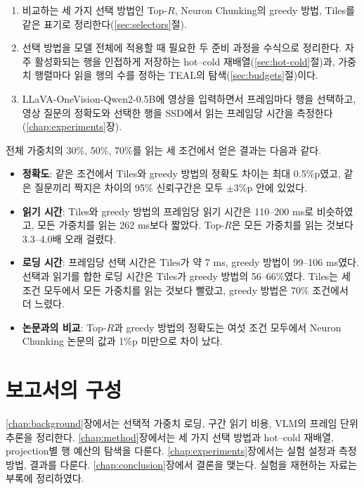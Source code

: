 \begin{enumerate}
\item 비교하는 세 가지 선택 방법인 Top-$R$, Neuron Chunking의 greedy 방법, Tiles를 같은 표기로 정리한다(\ref{sec:selectors}절).
\item 선택 방법을 모델 전체에 적용할 때 필요한 두 준비 과정을 수식으로 정리한다. 자주 활성화되는 행을 인접하게 저장하는 hot--cold 재배열(\ref{sec:hot-cold}절)과, 가중치 행렬마다 읽을 행의 수를 정하는 TEAL의 탐색(\ref{sec:budgets}절)이다.
\item LLaVA-OneVision-Qwen2-0.5B에 영상을 입력하면서 프레임마다 행을 선택하고, 영상 질문의 정확도와 선택한 행을 SSD에서 읽는 프레임당 시간을 측정한다(\ref{chap:experiments}장).
\end{enumerate}

전체 가중치의 30\%, 50\%, 70\%를 읽는 세 조건에서 얻은 결과는 다음과 같다.

\begin{itemize}
\item \textbf{정확도}: 같은 조건에서 Tiles와 greedy 방법의 정확도 차이는 최대 0.5\%p였고, 같은 질문끼리 짝지은 차이의 95\% 신뢰구간은 모두 $\pm3$\%p 안에 있었다.
\item \textbf{읽기 시간}: Tiles와 greedy 방법의 프레임당 읽기 시간은 110--200 ms로 비슷하였고, 모든 가중치를 읽는 262 ms보다 짧았다. Top-$R$은 모든 가중치를 읽는 것보다 3.3--4.0배 오래 걸렸다.
\item \textbf{로딩 시간}: 프레임당 선택 시간은 Tiles가 약 7 ms, greedy 방법이 99--106 ms였다. 선택과 읽기를 합한 로딩 시간은 Tiles가 greedy 방법의 56--66\%였다. Tiles는 세 조건 모두에서 모든 가중치를 읽는 것보다 빨랐고, greedy 방법은 70\% 조건에서 더 느렸다.
\item \textbf{논문과의 비교}: Top-$R$과 greedy 방법의 정확도는 여섯 조건 모두에서 Neuron Chunking 논문의 값과 1\%p 미만으로 차이 났다.
\end{itemize}

\section{보고서의 구성}\label{sec:intro-outline}

\ref{chap:background}장에서는 선택적 가중치 로딩, 구간 읽기 비용, VLM의 프레임 단위 추론을 정리한다. \ref{chap:method}장에서는 세 가지 선택 방법과 hot--cold 재배열, projection별 행 예산의 탐색을 다룬다. \ref{chap:experiments}장에서는 실험 설정과 측정 방법, 결과를 다룬다. \ref{chap:conclusion}장에서 결론을 맺는다. 실험을 재현하는 자료는 부록에 정리하였다.

